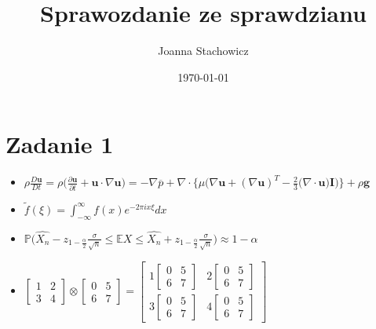 \documentclass[a4paper, 11pt]{article}
\author{Joanna Stachowicz}
\title{Sprawozdanie ze sprawdzianu}
\date{\today}
\begin{document}
\maketitle

\section*{Zadanie 1}
\begin{itemize}
    \item $ \rho\frac{D\textbf{u}}{Dt} = \rho \big( \frac{\partial
    \textbf{u}}{\partial t} + \textbf{u} \cdot \nabla \textbf{u}\big) = -\nabla \overline p + \nabla 
    \cdot \big\{\mu \big(\nabla \textbf{u} + (\nabla \textbf{u})^T - \frac{2}{3}(\nabla \cdot\textbf{u}      
    \big) \textbf{I} \big)\big\} + \rho\textbf{g} $
    
    \item $ \tilde{f}(\xi) = \int^\infty_{-\infty} f(x) e^{-2\pi ix\xi}dx $
    
    \item $ \mathbb{P}\big(\hat{X_n} - z_{1-\frac{\alpha}{2}} \frac{\sigma}{\sqrt{n}} \leq \mathbb{E} X
    \leq \hat{X_n} + z_{1-\frac{\alpha}{2}} \frac{\sigma}{\sqrt{n}}\big) \approx 1 - \alpha $
    
    \item $ \begin{bmatrix} 1 & 2 \\ 3 & 4 \end{bmatrix} \otimes \begin{bmatrix} 0 & 5 \\ 6 & 7 \end{bmatrix} =
    \begin{bmatrix} 1 \begin{bmatrix} 0 & 5 \\ 6 & 7 \end{bmatrix} & 2 \begin{bmatrix} 0 & 5 \\ 6 & 7 \end{bmatrix} \\
    3 \begin{bmatrix} 0 & 5 \\ 6 & 7 \end{bmatrix} & 4 \begin{bmatrix} 0 & 5 \\ 6 & 7 \end{bmatrix} \end{bmatrix} $
    
\end{itemize}
\end{document}
